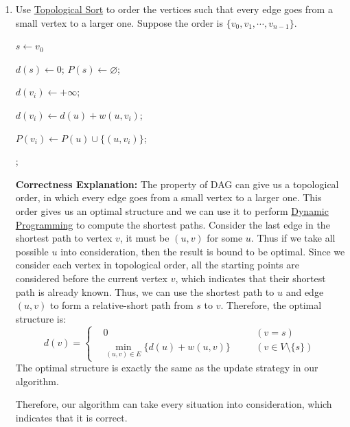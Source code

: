 \documentclass[12pt,a4paper]{article}
\makeatletter
\newtheorem*{solution}{Solution}
\theoremstyle{definition}
\renewenvironment{solution}[1][Solution] {\par\pushQED{\qed}\normalfont\topsep6\p@\@plus6\p@\relax\trivlist\item[\hskip\labelsep\bfseries#1\@addpunct{.}]\ignorespaces}{\popQED\endtrivlist\@endpefalse} \makeatother
\makeatother
\begin{document}
\begin{enumerate}
\begin{solution}
\begin{enumerate}
\begin{minipage}[t]{0.8\textwidth}
\begin{algorithm}[H]
            Use \underline{Topological Sort} to order the vertices such that every edge goes from a small vertex to a larger one. Suppose the order is $\{v_0, v_1, \cdots, v_{n-1}\}$.

            $s \leftarrow v_0$ 

            $d(s) \leftarrow 0$; $P(s) \leftarrow \varnothing$;

             {
                $d(v_i) \leftarrow +\infty$;

                 {
                     {
                        $d(v_i) \leftarrow d(u) + w(u, v_i)$;

                        $P(v_i) \leftarrow P(u) \cup \{ (u, v_i) \}$;
                    }
                }
            }
            ;
        \end{algorithm}
        \end{minipage}

        \textbf{Correctness Explanation: } The property of DAG can give us a topological order, in which every edge goes from a small vertex to a larger one. This order gives us an optimal structure and we can use it to perform \underline{Dynamic Programming} to compute the shortest paths. Consider the last edge in the shortest path to vertex $v$, it must be $(u, v)$ for some $u$. Thus if we take all possible $u$ into consideration, then the result is bound to be optimal. Since we consider each vertex in topological order, all the starting points are considered before the current vertex $v$, which indicates that their shortest path is already known. Thus, we can use the shortest path to $u$ and edge $(u, v)$ to form a relative-short path from $s$ to $v$. Therefore, the optimal structure is:
        \begin{displaymath}
        d(v) = \left\{
        \begin{aligned}
            & 0 && \quad (v = s) \\
            & \min_{(u, v) \in E}\{d(u) + w(u, v)\} && \quad (v \in V \setminus \{s\})
        \end{aligned}
        \right.
        \end{displaymath}
        The optimal structure is exactly the same as the update strategy in our algorithm.

        Therefore, our algorithm can take every situation into consideration, which indicates that it is correct.


\end{enumerate}
\end{solution}
\end{enumerate}
\end{document}

